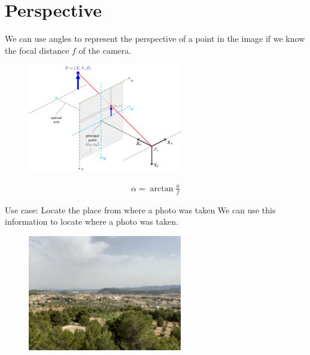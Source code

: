 \section{Perspective}

\begin{frame}{\secname}{}
    We can use angles to represent the perspective of a point in the image if we know the focal distance $f$ of the camera.
    \begin{multicols}{2}
        \begin{figure}
        \includegraphics[width=0.6\textwidth]{img/fov.png}
    \end{figure}
    \phantom{}
    \vfill
    \begin{gather*}
        \alpha = \arctan\frac{u}{f}
    \end{gather*}
    \vfill
    \phantom{}
    \end{multicols}
\end{frame}

\begin{frame}{\secname}{Use case: Locate the place from where a photo was taken}
    We can use this information to locate where a photo was taken.
    \begin{figure}
        \centering
        \includegraphics[width=0.6\textwidth]{img/mirador1_ipad.jpeg}
    \end{figure}
\end{frame}

